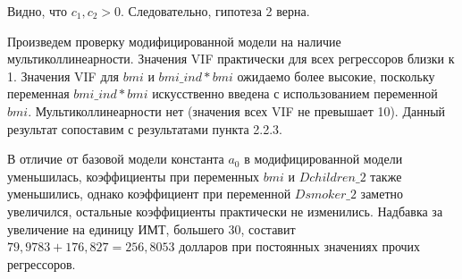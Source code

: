 \documentclass[a4paper,12pt]{article}
\begin{document}
Видно, что $c_1, c_2 >0$. Следовательно, гипотеза 2 верна.

Произведем проверку модифицированной модели на наличие мультиколлинеарности. Значения VIF практически для всех регрессоров близки к 1. Значения VIF для $bmi$ и $bmi\_ind * bmi$ ожидаемо более высокие, поскольку переменная $bmi\_ind * bmi$ искусственно введена с использованием переменной $bmi$. Мультиколлинеарности нет (значения всех VIF не превышает 10). Данный результат сопоставим с результатами пункта 2.2.3.

В отличие от базовой модели константа $a_0$ в модифицированной модели уменьшилась, коэффициенты при переменных $bmi$ и $Dchildren\_2$ также уменьшились, однако коэффициент при переменной $Dsmoker\_2$ заметно увеличился, остальные коэффициенты практически не изменились. Надбавка за увеличение на единицу ИМТ, большего 30, составит $79,9783 + 176,827 = 256,8053$ долларов при постоянных значениях прочих регрессоров.
\end{document}
